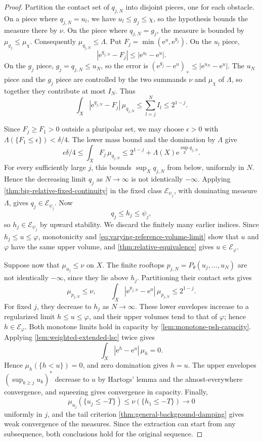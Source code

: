 \begin{proof}
Partition the contact set of $q_{j,N}$ into disjoint pieces, one for each obstacle. On a piece where $q_{j,N}=u_l$, we have $u_l\leq g_j\leq\chi$, so the hypothesis bounds the measure there by $\nu$. On the piece where $q_{j,N}=g_j$, the measure is bounded by $\mu_{g_j}\leq\mu_\chi$. Consequently $\mu_{q_{j,N}}\leq\Lambda$. Put $F_j=\min(\mathrm{e}^u,\mathrm{e}^{g_j})$. On the $u_l$ piece,
\[
 |\mathrm{e}^{q_{j,N}}-F_j|\leq|\mathrm{e}^{u_l}-\mathrm{e}^u|.
\]
On the $g_j$ piece, $g_j=q_{j,N}\leq u_N$, so the error is
$(\mathrm{e}^{g_j}-\mathrm{e}^u)_+\leq|\mathrm{e}^{u_N}-\mathrm{e}^u|$.
The $u_N$ piece and the $g_j$ piece are controlled by the two summands $\nu$ and $\mu_\chi$ of $\Lambda$, so together they contribute at most $I_N$. Thus
\begin{equation}\label{eq:varying-roof-exponential-error}
 \int_X|\mathrm{e}^{q_{j,N}}-F_j|\,\mu_{q_{j,N}}
 \leq\sum_{l=j}^N I_l\leq2^{1-j}.
\end{equation}

Since $F_j\geq F_1>0$ outside a pluripolar set, we may choose $\epsilon>0$ with $\Lambda(\{F_1\leq\epsilon\})<\delta/4$. The lower mass bound and the domination by $\Lambda$ give
\[
 \epsilon\delta/4
 \leq\int_X F_j\,\mu_{q_{j,N}}
 \leq2^{1-j}+\Lambda(X)\mathrm{e}^{\sup_Xq_{j,N}}.
\]
For every sufficiently large $j$, this bounds $\sup_Xq_{j,N}$ from below, uniformly in $N$. Hence the decreasing limit $q_j$ as $N\to\infty$ is not identically $-\infty$. Applying \cref{thm:big-relative-fixed-continuity} in the fixed class $\mathcal E_{\psi_j}$, with dominating measure $\Lambda$, gives $q_j\in\mathcal E_{\psi_j}$. Now
\[
 q_j\leq h_j\leq\psi_j,
\]
so $h_j\in\mathcal E_{\psi_j}$ by upward stability. We discard the finitely many earlier indices. Since $h_j\leq u\leq\varphi$, monotonicity and \eqref{eq:varying-reference-volume-limit} show that $u$ and $\varphi$ have the same upper volume, and \cref{thm:relative-equivalence} gives $u\in\mathcal E_\varphi$.

Suppose now that $\mu_{u_j}\leq\nu$ on $X$. The finite rooftops $p_{j,N}=P_\theta(u_j,\ldots,u_N)$ are not identically $-\infty$, since they lie above $h_j$. Partitioning their contact sets gives
\[
 \mu_{p_{j,N}}\leq\nu,\qquad
 \int_X|\mathrm{e}^{p_{j,N}}-\mathrm{e}^u|\,\mu_{p_{j,N}}\leq2^{1-j}.
\]
For fixed $j$, they decrease to $h_j$ as $N\to\infty$. These lower envelopes increase to a regularized limit $h\leq u\leq\varphi$, and their upper volumes tend to that of $\varphi$; hence $h\in\mathcal E_\varphi$. Both monotone limits hold in capacity by \cref{lem:monotone-psh-capacity}. Applying \cref{lem:weighted-extended-lsc} twice gives
\[
 \int_X|\mathrm{e}^h-\mathrm{e}^u|\,\mu_h=0.
\]
Hence $\mu_h(\{h<u\})=0$, and zero domination gives $h=u$. The upper envelopes $(\sup_{k\geq j}u_k)^*$ decrease to $u$ by Hartogs' lemma and the almost-everywhere convergence, and squeezing gives convergence in capacity. Finally,
\[
 \mu_{u_j}(\{u_j\leq-T\})\leq\nu(\{h_1\leq-T\})\longrightarrow0
\]
uniformly in $j$, and the tail criterion \cref{thm:general-background-damping} gives weak convergence of the measures. Since the extraction can start from any subsequence, both conclusions hold for the original sequence.
\end{proof}
